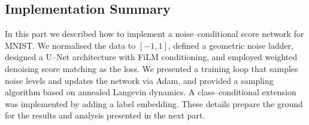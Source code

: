 \subsection{Implementation Summary}

In this part we described how to implement a noise–conditional score
network for MNIST.  We normalised the data to $[-1,1]$, defined a
geometric noise ladder, designed a U–Net architecture with FiLM
conditioning, and employed weighted denoising score matching as the loss.
We presented a training loop that samples noise levels and updates the
network via Adam, and provided a sampling algorithm based on annealed
Langevin dynamics.  A class–conditional extension was implemented by
adding a label embedding.  These details prepare the ground for the
results and analysis presented in the next part.